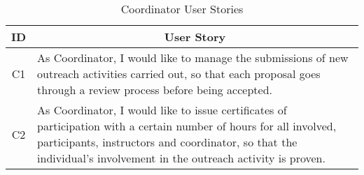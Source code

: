 \begin{table}[!htb]
  \centering
  \setlength{\aboverulesep}{0pt}
  \setlength{\belowrulesep}{0pt}
  \caption{Coordinator User Stories}
  \label{tab:coordinator-user-stories}
  \footnotesize
  \begin{tabularx}{\textwidth}{c|X}
    \toprule
    \rowcolor[rgb]{0.753,0.753,0.753} \textbf{ID} & \multicolumn{1}{c}{\textbf{User Story}}                    \\
    \hline
    \rowcolor[rgb]{0.898,0.898,0.898} C1          & As Coordinator, I would like to manage the submissions of new outreach activities carried out, so that each proposal goes through a review process before being accepted.                                           \\
    C2                                            & As Coordinator, I would like to issue certificates of participation with a certain number of hours for all involved, participants, instructors and coordinator, so that the individual's involvement in the outreach activity is proven.                                     \\
    \bottomrule
  \end{tabularx}
\end{table}
